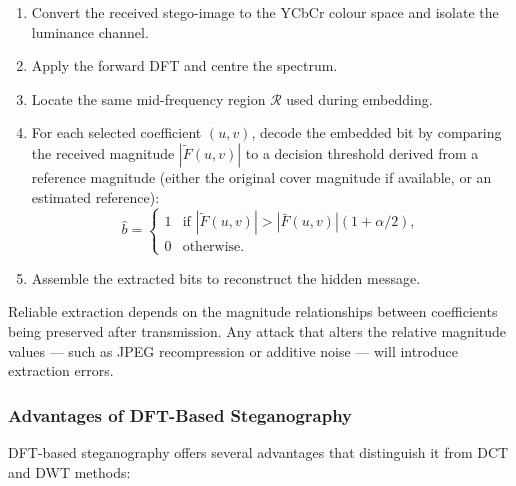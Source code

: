\documentclass[12pt,a4paper,oneside]{report}
\begin{document}
	\begin{enumerate}
		\item Convert the received stego-image to the YCbCr colour space and isolate the
		luminance channel.
		\item Apply the forward DFT and centre the spectrum.
		\item Locate the same mid-frequency region $\mathcal{R}$ used during embedding.
		\item For each selected coefficient $(u,v)$, decode the embedded bit by comparing the
		received magnitude $|\tilde{F}(u,v)|$ to a decision threshold derived from a
		reference magnitude (either the original cover magnitude if available, or an
		estimated reference):
		\begin{equation}
			\hat{b} = \begin{cases}
				1 & \text{if } |\tilde{F}(u,v)| > |\bar{F}(u,v)|(1 + \alpha/2),\\
				0 & \text{otherwise.}
			\end{cases}
			\label{eq:dft_extract}
		\end{equation}
		\item Assemble the extracted bits to reconstruct the hidden message.
	\end{enumerate}
	
	Reliable extraction depends on the magnitude relationships between coefficients being
	preserved after transmission. Any attack that alters the relative magnitude values — such
	as JPEG recompression or additive noise — will introduce extraction errors.
	
	\subsubsection{Advantages of DFT-Based Steganography}
	
	DFT-based steganography offers several advantages that distinguish it from DCT and DWT
	methods:
	
\end{document}
